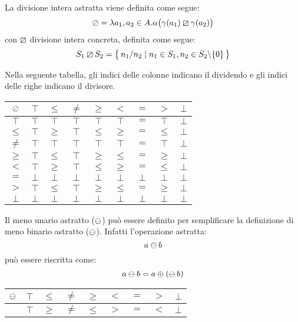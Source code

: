 \begin{definizione}
La divisione intera astratta viene definita come segue:
\[
	\mathbin{\oslash} = \lambda a_1,a_2 \in A . \alpha\bigl(\gamma(a_1) \mathbin{\boxslash} \gamma(a_2)\bigr)
\]
con $\mathbin{\boxslash}$ divisione intera concreta, definita come segue:
\[
	S_1 \mathbin{\boxslash} S_2 = \bigl\{\, n_1 / n_2 \mid n_1 \in S_1, n_2 \in S_2 \backslash \{0\} \,\bigr\}
\]
\end{definizione}
Nella seguente tabella, gli indici delle colonne indicano il dividendo e gli indici delle righe indicano il divisore.
\begin{center}
	\begin{tabular}{c | c c c c c c c c }
		$\mathbin{\oslash}$ & $\top$ & $\leq$ & $\neq$ & $\geq$ & $<$ & $=$ & $>$ & $\bot$ \\
		\hline
		$\top$ & $\top$ & $\top$ & $\top$ & $\top$ & $\top$ & $=$ & $\top$ & $\bot$\\
		$\leq$ & $\top$ & $\geq$ & $\top$ & $\leq$ & $\geq$ & $=$ & $\leq$ & $\bot$\\
		$\neq$ & $\top$ & $\top$ & $\top$ & $\top$ & $\top$ & $=$ & $\top$ & $\bot$\\
		$\geq$ & $\top$ & $\leq$ & $\top$ & $\geq$ & $\leq$ & $=$ & $\geq$ & $\bot$\\
		$<$ & $\top$ & $\geq$ & $\top$ & $\leq$ & $\geq$ & $=$ & $\leq$ & $\bot$\\
		$=$ & $\bot$ & $\bot$ & $\bot$ & $\bot$ & $\bot$ & $\bot$ & $\bot$ & $\bot$\\
		$>$ & $\top$ & $\leq$ & $\top$ & $\geq$ & $\leq$ & $=$ & $\geq$ & $\bot$\\
		$\bot$ & $\bot$ & $\bot$ & $\bot$ & $\bot$ & $\bot$ & $\bot$ & $\bot$ & $\bot$
	\end{tabular}
\end{center}

\begin{definizione}
Il meno unario astratto ($\mathop{\ominus}\nolimits$) può essere definito
per semplificare la definizione di meno binario astratto ($\mathbin{\ominus}$).
Infatti l'operazione astratta:
\[
	a \mathbin{\ominus} b
\]
può essere riscritta come:
\[
	a  \mathbin{\ominus} b = a \mathbin{\oplus} (\mathop{\ominus}\nolimits b)
\]
\end{definizione}

\begin{center}
	\begin{tabular}{ c | c c c c c c c c }
		$\mathop{\ominus}\nolimits$ & $\top$ & $\leq$ & $\neq$ & $\geq$ & $<$ & $=$ & $>$ & $\bot$ \\
		\hline
		  & $\top$ & $\geq$ & $\neq$ & $\leq$ & $>$ & $=$ & $<$ & $\bot$
	\end{tabular}
\end{center}

